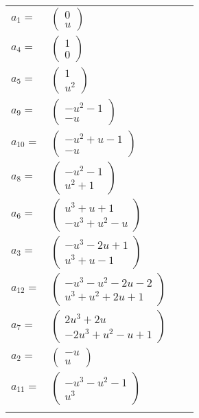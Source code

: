 \documentclass[1p]{elsarticle_modified}
\theoremstyle{definition}
\begin{document}
\begin{tabular}{m{7pt} m{180pt} m{7pt} m{180pt} }
\flushright $a_{1}=$&$\begin{pmatrix}0\\u\end{pmatrix}$ \\
\flushright $a_{4}=$&$\begin{pmatrix}1\\0\end{pmatrix}$ \\
\flushright $a_{5}=$&$\begin{pmatrix}1\\u^2\end{pmatrix}$ \\
\flushright $a_{9}=$&$\begin{pmatrix}- u^2-1\\- u\end{pmatrix}$ \\
\flushright $a_{10}=$&$\begin{pmatrix}- u^2+u-1\\- u\end{pmatrix}$ \\
\flushright $a_{8}=$&$\begin{pmatrix}- u^2-1\\u^2+1\end{pmatrix}$ \\
\flushright $a_{6}=$&$\begin{pmatrix}u^3+u+1\\- u^3+u^2- u\end{pmatrix}$ \\
\flushright $a_{3}=$&$\begin{pmatrix}- u^3-2 u+1\\u^3+u-1\end{pmatrix}$ \\
\flushright $a_{12}=$&$\begin{pmatrix}- u^3- u^2-2 u-2\\u^3+u^2+2 u+1\end{pmatrix}$ \\
\flushright $a_{7}=$&$\begin{pmatrix}2 u^3+2 u\\-2 u^3+u^2- u+1\end{pmatrix}$ \\
\flushright $a_{2}=$&$\begin{pmatrix}- u\\u\end{pmatrix}$ \\
\flushright $a_{11}=$&$\begin{pmatrix}- u^3- u^2-1\\u^3\end{pmatrix}$\\&\end{tabular}
\end{document}
